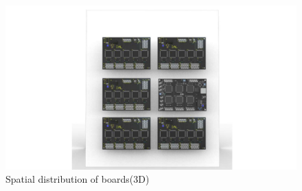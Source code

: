 \begin{figure}[!ht]
	\centering
	\includegraphics[width=16cm]{grafiken/5.3.pdf}
	\caption{Spatial distribution of boards(3D)} 
	\label{fig:5.3}
\end{figure}
\FloatBarrier




